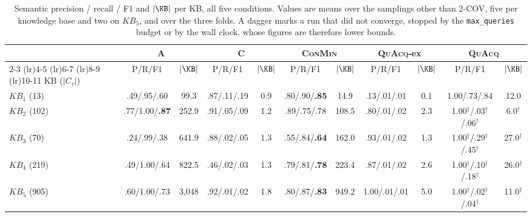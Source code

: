 \begin{table}[t]
\centering
\small
\setlength{\tabcolsep}{4pt}
\begin{tabular}{lcccccccccc}
\toprule
 & \multicolumn{2}{c}{A} & \multicolumn{2}{c}{C} & \multicolumn{2}{c}{\textsc{ConMin}} & \multicolumn{2}{c}{\textsc{QuAcq}-ex} & \multicolumn{2}{c}{\textsc{QuAcq}} \tabularnewline
\cmidrule(lr){2-3} \cmidrule(lr){4-5} \cmidrule(lr){6-7} \cmidrule(lr){8-9} \cmidrule(lr){10-11}
KB ($|C_\tau|$) & P/R/F1 & $|\KB|$ & P/R/F1 & $|\KB|$ & P/R/F1 & $|\KB|$ & P/R/F1 & $|\KB|$ & P/R/F1 & $|\KB|$ \tabularnewline
\midrule
$KB_{1}$ (13) & .49/.95/.60 & 99.3 & .87/.11/.19 & 0.9 & .80/.90/\textbf{.85} & 14.9 & .13/.01/.01 & 0.1 & 1.00/.73/.84 & 12.0 \tabularnewline
$KB_{2}$ (102) & .77/1.00/\textbf{.87} & 252.9 & .91/.05/.09 & 1.2 & .89/.75/.78 & 108.5 & .80/.01/.02 & 2.3 & 1.00$^{\dagger}$/.03$^{\dagger}$/.06$^{\dagger}$ & 6.0$^{\dagger}$ \tabularnewline
$KB_{3}$ (70) & .24/.99/.38 & 641.9 & .88/.02/.05 & 1.3 & .55/.84/\textbf{.64} & 162.0 & .93/.01/.02 & 1.3 & 1.00$^{\dagger}$/.29$^{\dagger}$/.45$^{\dagger}$ & 27.0$^{\dagger}$ \tabularnewline
$KB_{4}$ (219) & .49/1.00/.64 & 822.5 & .46/.02/.03 & 1.3 & .79/.81/\textbf{.78} & 223.4 & .87/.01/.02 & 2.6 & 1.00$^{\dagger}$/.10$^{\dagger}$/.18$^{\dagger}$ & 26.0$^{\dagger}$ \tabularnewline
$KB_{5}$ (905) & .60/1.00/.73 & 3,048 & .92/.01/.02 & 1.8 & .80/.87/\textbf{.83} & 949.2 & 1.00/.01/.01 & 5.0 & 1.00$^{\dagger}$/.02$^{\dagger}$/.04$^{\dagger}$ & 11.0$^{\dagger}$ \tabularnewline
\bottomrule
\end{tabular}
\caption{Semantic precision / recall / F1 and $|\KB|$ per KB, all five conditions. Values are means over the samplings other than 2-COV, five per knowledge base and two on $KB_5$, and over the three folds. A dagger marks a run that did not converge, stopped by the \texttt{max\_queries} budget or by the wall clock, whose figures are therefore lower bounds.}
\label{tab:eval-prf}
\end{table}

